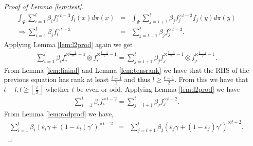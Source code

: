 \documentclass[aos]{imsart}
\def\l{\left}
\def\r{\right}
\theoremstyle{plain}
\theoremstyle{defintion}
\begin{document}
\begin{proof}[Proof of Lemma \ref{lem:test}]
		\begin{eqnarray*}
			\int_\Psi \sum_{i=1}^l \beta_i f_i^{\times t-3}f_i(x) d\pi(x) &=& \int_\Psi \sum_{j=l+1}^{t}\beta_j f_j^{\times t-3} f_j(y) d\pi(y)\\
			\Rightarrow  \sum_{i=1}^l \beta_i f_i^{\times t-3} &=&  \sum_{j=l+1}^{t}\beta_j f_j^{\times t-3}.
		\end{eqnarray*}
		Applying Lemma \ref{lem:l2prod} again we get
		\begin{eqnarray*}
			\sum_{i=1}^l \beta_i f_i^{\otimes \frac{t-1}{2} -1 } \otimes f_i^{\otimes \frac{t-1}{2} -1 } = \sum_{j=l+1}^{t}\beta_j f_j^{\otimes \frac{t-1}{2} -1 } \otimes f_j^{\otimes \frac{t-1}{2} -1 }.
		\end{eqnarray*}
		From Lemma \ref{lem:linind} and Lemma \ref{lem:tensrank} we have that the RHS of the previous equation has rank at least $\frac{t-1}{2}$ and thus $l\ge \frac{t-1}{2}$. From this we have that $t-l,l\ge \l\lfloor \frac{t}{2}\r\rfloor$ whether $t$ be even or odd.
		Applying Lemma \ref{lem:l2prod} we have 
		\begin{eqnarray*}
			\sum_{i=1}^l \beta_i f_i^{\times t-2} = \sum_{j=l+1}^{t}\beta_j f_j^{\times t-2}.
		\end{eqnarray*}
		From Lemma \ref{lem:radprod} we have,
		\begin{eqnarray*}
			\sum_{i=1}^l  \beta_i \left( \varepsilon_i \gamma + \left( 1-\varepsilon_i \right) \gamma' \right)^{\times t-2}   &=& \sum_{j=l+1}^{t} \beta_j \left( \varepsilon_j \gamma + \left( 1-\varepsilon_j \right) \gamma' \right)^{\times t-2}.
		\end{eqnarray*}
	\end{proof}

	
\end{document}
